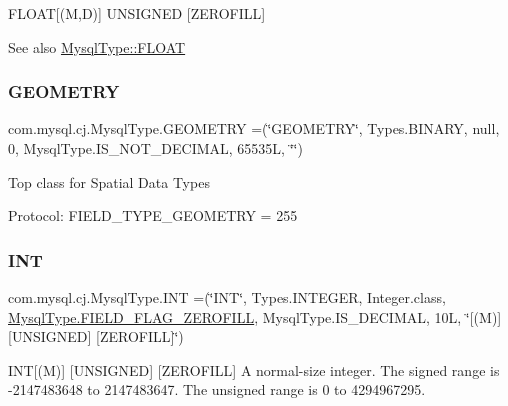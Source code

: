 F\+L\+O\+AT\mbox{[}(M,D)\mbox{]} U\+N\+S\+I\+G\+N\+ED \mbox{[}Z\+E\+R\+O\+F\+I\+LL\mbox{]}

\begin{DoxySeeAlso}{See also}
\mbox{\hyperlink{enumcom_1_1mysql_1_1cj_1_1_mysql_type_ae8cf970114766445c4e064ee748fb74c}{Mysql\+Type\+::\+F\+L\+O\+AT}} 
\end{DoxySeeAlso}
\mbox{\label{enumcom_1_1mysql_1_1cj_1_1_mysql_type_aa49cdfb7c144fe5dcf23fe5c31bfe82d}} 
\subsubsection{\texorpdfstring{G\+E\+O\+M\+E\+T\+RY}{GEOMETRY}}
{\footnotesize\ttfamily com.\+mysql.\+cj.\+Mysql\+Type.\+G\+E\+O\+M\+E\+T\+RY =(\char`\"{}G\+E\+O\+M\+E\+T\+RY\char`\"{}, Types.\+B\+I\+N\+A\+RY, null, 0, Mysql\+Type.\+I\+S\+\_\+\+N\+O\+T\+\_\+\+D\+E\+C\+I\+M\+AL, 65535\+L, \char`\"{}\char`\"{})}

Top class for Spatial Data Types

Protocol\+: F\+I\+E\+L\+D\+\_\+\+T\+Y\+P\+E\+\_\+\+G\+E\+O\+M\+E\+T\+RY = 255 \mbox{\label{enumcom_1_1mysql_1_1cj_1_1_mysql_type_a01116c8fe484233659c251ee68f56d25}} 
\subsubsection{\texorpdfstring{I\+NT}{INT}}
{\footnotesize\ttfamily com.\+mysql.\+cj.\+Mysql\+Type.\+I\+NT =(\char`\"{}I\+NT\char`\"{}, Types.\+I\+N\+T\+E\+G\+ER, Integer.\+class, \mbox{\hyperlink{enumcom_1_1mysql_1_1cj_1_1_mysql_type_abb76a1f2f3dac9a30d1b559b8ba66a48}{Mysql\+Type.\+F\+I\+E\+L\+D\+\_\+\+F\+L\+A\+G\+\_\+\+Z\+E\+R\+O\+F\+I\+LL}}, Mysql\+Type.\+I\+S\+\_\+\+D\+E\+C\+I\+M\+AL, 10\+L, \char`\"{}\mbox{[}(\+M)\mbox{]} \mbox{[}\+U\+N\+S\+I\+G\+N\+E\+D\mbox{]} \mbox{[}\+Z\+E\+R\+O\+F\+I\+L\+L\mbox{]}\char`\"{})}

I\+NT\mbox{[}(M)\mbox{]} \mbox{[}U\+N\+S\+I\+G\+N\+ED\mbox{]} \mbox{[}Z\+E\+R\+O\+F\+I\+LL\mbox{]} A normal-\/size integer. The signed range is -\/2147483648 to 2147483647. The unsigned range is 0 to 4294967295.

